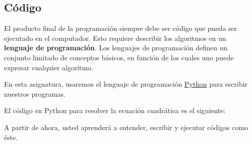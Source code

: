\subsection{Código}

El producto final de la programación siempre debe ser código que pueda
ser ejecutado en el computador. Esto requiere describir los algoritmos
en un \textbf{lenguaje de programación}. Los lenguajes de programación
definen un conjunto limitado de conceptos básicos, en función de los
cuales uno puede expresar cualquier algoritmo.

En esta asignatura, usaremos el lenguaje de programación
\href{http://python.org/}{Python} para escribir nuestros programas.

El código en Python para resolver la ecuación cuadrática es el
siguiente:


A partir de ahora, usted aprenderá a entender, escribir y ejecutar
códigos como éste.
